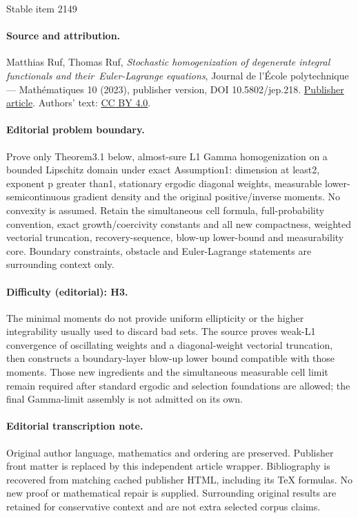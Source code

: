 \documentclass[11pt]{article}
\numberwithin{equation}{section}
\theoremstyle{definition}
\begin{document}
\begin{center}{\Large Stable item 2149}\end{center}
\paragraph{Source and attribution.}
Matthias Ruf, Thomas Ruf, \emph{Stochastic homogenization of degenerate integral functionals and their Euler-Lagrange equations}, Journal de l’École polytechnique — Mathématiques 10 (2023), publisher version, DOI 10.5802/jep.218. \href{https://jep.centre-mersenne.org/articles/10.5802/jep.218/}{Publisher article}. Authors' text: \href{https://creativecommons.org/licenses/by/4.0/}{CC BY 4.0}.
\paragraph{Editorial problem boundary.}
Prove only Theorem3.1 below, almost-sure L1 Gamma homogenization on a bounded Lipschitz domain under exact Assumption1: dimension at least2, exponent p greater than1, stationary ergodic diagonal weights, measurable lower-semicontinuous gradient density and the original positive/inverse moments. No convexity is assumed. Retain the simultaneous cell formula, full-probability convention, exact growth/coercivity constants and all new compactness, weighted vectorial truncation, recovery-sequence, blow-up lower-bound and measurability core. Boundary constraints, obstacle and Euler-Lagrange statements are surrounding context only.
\paragraph{Difficulty (editorial): H3.}
The minimal moments do not provide uniform ellipticity or the higher integrability usually used to discard bad sets. The source proves weak-L1 convergence of oscillating weights and a diagonal-weight vectorial truncation, then constructs a boundary-layer blow-up lower bound compatible with those moments. Those new ingredients and the simultaneous measurable cell limit remain required after standard ergodic and selection foundations are allowed; the final Gamma-limit assembly is not admitted on its own.
\paragraph{Editorial transcription note.}
Original author language, mathematics and ordering are preserved. Publisher front matter is replaced by this independent article wrapper. Bibliography is recovered from matching cached publisher HTML, including its TeX formulas. No new proof or mathematical repair is supplied. Surrounding original results are retained for conservative context and are not extra selected corpus claims.
\clearpage
\end{document}
